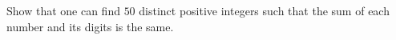 Show that one can find $50$ distinct positive integers such that the sum of each number and its digits is the same.